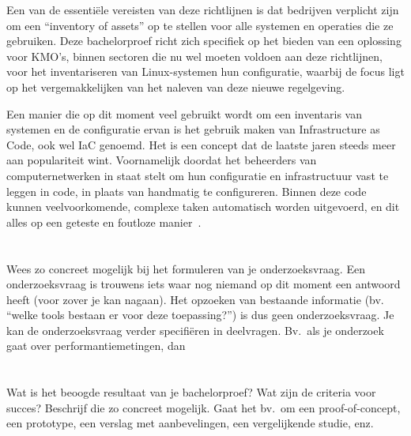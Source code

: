 Een van de essenti\"ele vereisten van deze richtlijnen is dat bedrijven verplicht zijn om een ``inventory of assets'' op te stellen voor alle systemen en operaties die ze gebruiken.
Deze bachelorproef richt zich specifiek op het bieden van een oplossing voor KMO's, binnen sectoren die nu wel moeten voldoen aan deze richtlijnen, voor het inventariseren van Linux-systemen hun configuratie, waarbij de focus ligt op het vergemakkelijken van het naleven van deze nieuwe regelgeving.

Een manier die op dit moment veel gebruikt wordt om een inventaris van systemen en de configuratie ervan is het gebruik maken van Infrastructure as Code, ook wel IaC genoemd.
Het is een concept dat de laatste jaren steeds meer aan populariteit wint. Voornamelijk doordat het beheerders van computernetwerken in staat stelt om hun configuratie en infrastructuur vast te leggen in code, in plaats van handmatig te configureren.
Binnen deze code kunnen veelvoorkomende, complexe taken automatisch worden uitgevoerd, en dit alles op een geteste en foutloze manier~\autocite{chef-what-is-iac}.

\section{}%
\label{sec:onderzoeksvraag}

Wees zo concreet mogelijk bij het formuleren van je onderzoeksvraag. Een onderzoeksvraag is trouwens iets waar nog niemand op dit moment een antwoord heeft (voor zover je kan nagaan). Het opzoeken van bestaande informatie (bv. ``welke tools bestaan er voor deze toepassing?'') is dus geen onderzoeksvraag. Je kan de onderzoeksvraag verder specifiëren in deelvragen. Bv.~als je onderzoek gaat over performantiemetingen, dan 

\section{}%
\label{sec:onderzoeksdoelstelling}

Wat is het beoogde resultaat van je bachelorproef? Wat zijn de criteria voor succes? Beschrijf die zo concreet mogelijk. Gaat het bv.\ om een proof-of-concept, een prototype, een verslag met aanbevelingen, een vergelijkende studie, enz.

\section{}%
\label{sec:opzet-bachelorproef}

